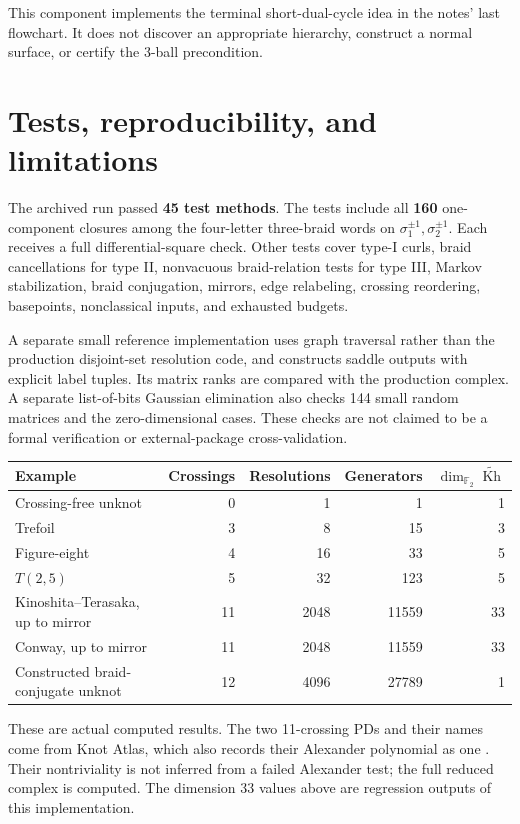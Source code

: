 \documentclass[11pt]{article}
\theoremstyle{definition}\newtheorem{definition}[theorem]{Definition}
\newcommand{\F}{\mathbb F_2}
\newcommand{\Kh}{\widetilde{\operatorname{Kh}}}
\begin{document}
This component implements the terminal short-dual-cycle idea in the notes'
last flowchart. It does not discover an appropriate hierarchy, construct a
normal surface, or certify the 3-ball precondition.

\section{Tests, reproducibility, and limitations}

The archived run passed \textbf{45 test methods}. The tests include all
\textbf{160} one-component closures among the four-letter three-braid words
on $\sigma_1^{\pm1},\sigma_2^{\pm1}$. Each receives a full differential-square
check. Other tests cover type-I curls, braid cancellations for type II,
nonvacuous braid-relation tests for type III, Markov stabilization, braid
conjugation, mirrors, edge relabeling, crossing reordering, basepoints,
nonclassical inputs, and exhausted budgets.

A separate small reference implementation uses graph traversal rather than
the production disjoint-set resolution code, and constructs saddle outputs
with explicit label tuples. Its matrix ranks are compared with the production
complex. A separate list-of-bits Gaussian elimination also checks 144
small random matrices and the zero-dimensional cases. These checks are not
claimed to be a formal verification or external-package cross-validation.

\begin{center}
\begin{tabular}{@{}lrrrr@{}}
\toprule
Example & Crossings & Resolutions & Generators & $\dim_{\F}\Kh$\\
\midrule
Crossing-free unknot & 0 & 1 & 1 & 1\\
Trefoil & 3 & 8 & 15 & 3\\
Figure-eight & 4 & 16 & 33 & 5\\
$T(2,5)$ & 5 & 32 & 123 & 5\\
Kinoshita--Terasaka, up to mirror & 11 & 2048 & 11559 & 33\\
Conway, up to mirror & 11 & 2048 & 11559 & 33\\
Constructed braid-conjugate unknot & 12 & 4096 & 27789 & 1\\
\bottomrule
\end{tabular}
\end{center}

These are actual computed results. The two 11-crossing PDs and their names
come from Knot Atlas, which also records their Alexander polynomial as one
\cite{atlas}. Their nontriviality is not inferred from a failed Alexander test;
the full reduced complex is computed. The dimension 33 values above are
regression outputs of this implementation.
\end{document}
